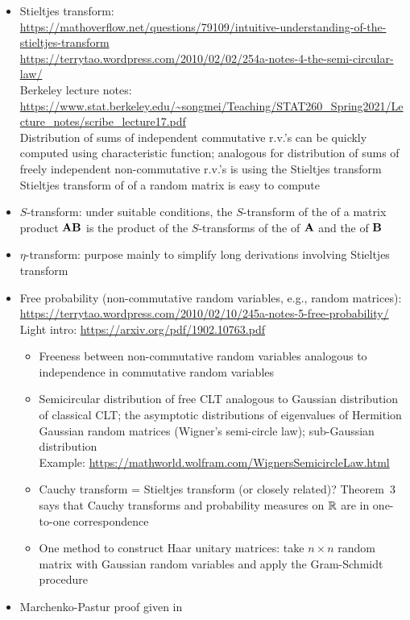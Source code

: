 \documentclass[10pt]{article}
\begin{document}
\begin{itemize}

\item
Stieltjes transform: \\
\url{https://mathoverflow.net/questions/79109/intuitive-understanding-of-the-stieltjes-transform} \\
\url{https://terrytao.wordpress.com/2010/02/02/254a-notes-4-the-semi-circular-law/} \\
Berkeley lecture notes: \url{https://www.stat.berkeley.edu/~songmei/Teaching/STAT260_Spring2021/Lecture_notes/scribe_lecture17.pdf} \\
Distribution of sums of independent commutative r.v.'s can be quickly computed using characteristic function; analogous for distribution of sums of freely independent non-commutative r.v.'s is using the Stieltjes transform \\
Stieltjes transform of \esd of a random matrix is easy to compute \citep{Couillet:2011}

\item
$S$-transform: under suitable conditions, the $S$-transform of the \lsd of a matrix product $\mathbf{A}\mathbf{B}$ is the product of the $S$-transforms of the \lsd of $\mathbf{A}$ and the \lsd of $\mathbf{B}$ \citep{Couillet:2011}

\item
$\eta$-transform: purpose mainly to simplify long derivations involving Stieltjes transform \citep{Couillet:2011}

\item
Free probability (non-commutative random variables, e.g., random matrices): \\
\url{https://terrytao.wordpress.com/2010/02/10/245a-notes-5-free-probability/} \\
Light intro: \url{https://arxiv.org/pdf/1902.10763.pdf} \citep{Xia:2019}
\begin{itemize}
\item
Freeness between non-commutative random variables analogous to independence in commutative random variables
\item
Semicircular distribution of free CLT analogous to Gaussian distribution of classical CLT; the asymptotic distributions of eigenvalues of Hermition Gaussian random matrices (Wigner's semi-circle law); sub-Gaussian distribution \\
Example: \url{https://mathworld.wolfram.com/WignersSemicircleLaw.html}
\item
Cauchy transform = Stieltjes transform (or closely related)? Theorem~3 says that Cauchy transforms and probability measures on $\mathbb{R}$ are in one-to-one correspondence
\item
One method to construct Haar unitary matrices: take $n\times n$ random matrix with \iid Gaussian random variables and apply the Gram-Schmidt procedure
\end{itemize}

\item
Marchenko-Pastur proof given in \citep{Couillet:2011}

\end{itemize}
\end{document}
